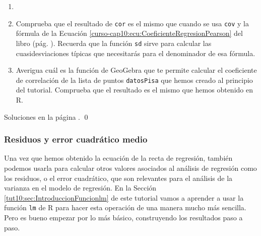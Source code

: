 \documentclass[10pt,a4paper]{article}\usepackage[]{graphicx}\usepackage[]{color}
\begin{document}
\begin{ejercicio}
\label{tut10:ejercicio02}
\begin{enumerate}
  \item[]
  \item Comprueba que el resultado de {\tt cor} es el mismo que cuando se usa {\tt cov} y la fórmula de la Ecuación \ref{curso-cap10:ecu:CoeficienteRegresionPearson} del libro (pág. \pageref{curso-cap10:ecu:CoeficienteRegresionPearson}). Recuerda que la función {\tt sd} sirve para calcular las cuasidesviaciones típicas que necesitarás para el denominador de esa fórmula.
  \item Averigua cuál es la función de GeoGebra que te permite calcular el coeficiente de correlación de la lista de puntos {\tt datosPisa} que hemos creado al principio del tutorial. Comprueba que el resultado es el mismo que hemos obtenido en R.
\end{enumerate}
Soluciones en la página \pageref{tut10:ejercicio02:sol}.
\qed
\end{ejercicio}



\subsubsection*{Residuos y error cuadrático medio}

Una vez que hemos obtenido la ecuación de la recta de regresión, también podemos usarla para calcular otros valores asociados al análisis de regresión como los residuos, o el error cuadrático, que son relevantes para el análisis de la varianza en el modelo de regresión. En la Sección \ref{tut10:sec:IntroduccionFuncionlm} de este tutorial vamos a aprender a usar la función {\tt lm} de R para hacer esta operación de una manera mucho más sencilla. Pero es bueno empezar por lo más básico, construyendo los resultados paso a paso.
\end{document}

